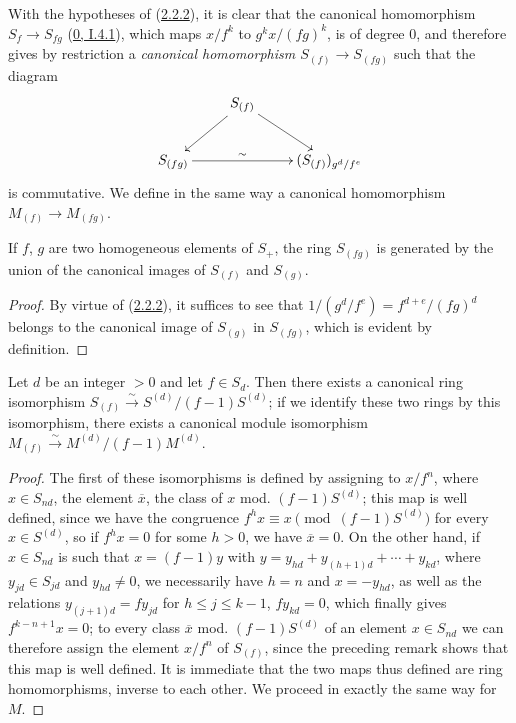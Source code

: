 \begin{env}[2.2.3]
\label{II.2.2.3}
With the hypotheses of (\hyperref[II.2.2.2]{2.2.2}), it is clear that
the canonical homomorphism $S_f\to S_{fg}$
(\hyperref[0.1.4.1]{0, I.4.1}), which maps $x/f^k$ to
$g^k x/(fg)^k$, is of degree $0$, and therefore gives by restriction a
\emph{canonical homomorphism $S_{(f)}\to S_{(fg)}$} such that the diagram
\[
  \xymatrix{
    & S_{(f)}\ar[dl]\ar[dr]\\
    S_{(fg)}\ar[rr]^-{\sim} && (S_{(f)})_{g^d/f^e}
  }
\]
is commutative. We define in the same way a canonical homomorphism
$M_{(f)}\to M_{(fg)}$.
\end{env}

\begin{lemma}[2.2.4]
\label{II.2.2.4}
If $f$, $g$ are two homogeneous elements of $S_+$, the ring $S_{(fg)}$ is
generated by the union of the canonical images of $S_{(f)}$ and $S_{(g)}$.
\end{lemma}

\begin{proof}
By virtue of (\hyperref[II.2.2.2]{2.2.2}), it suffices to see that
$1/(g^d/f^e)=f^{d+e}/(fg)^d$ belongs to the canonical image of $S_{(g)}$
in $S_{(fg)}$, which is evident by definition.
\end{proof}

\begin{proposition}[2.2.5]
\label{II.2.2.5}
Let $d$ be an integer $>0$ and let $f\in S_d$. Then there exists a canonical
ring isomorphism
$S_{(f)}\xrightarrow{\sim}S^{(d)}/(f-1)S^{(d)}$; if we identify these two
rings by this isomorphism, there exists a canonical module isomorphism
$M_{(f)}\xrightarrow{\sim}M^{(d)}/(f-1)M^{(d)}$.
\end{proposition}

\begin{proof}
The first of these isomorphisms is defined by assigning to
$x/f^n$, where $x\in S_{nd}$, the element $\overline{x}$, the class of $x$
mod. $(f-1)S^{(d)}$; this map is well defined, since we have the congruence
$f^h x\equiv x\pmod{(f-1)S^{(d)}}$ for every $x\in S^{(d)}$, so if
$f^h x=0$ for some $h>0$,
we have $\overline{x}=0$. On the other hand, if $x\in S_{nd}$ is such that
$x=(f-1)y$ with
$y=y_{hd}+y_{(h+1)d}+\cdots+y_{kd}$, where $y_{jd}\in S_{jd}$ and
$y_{hd}\neq 0$, we necessarily have $h=n$ and $x=-y_{hd}$, as well as the
relations $y_{(j+1)d}=fy_{jd}$ for $h\leq j\leq k-1$, $fy_{kd}=0$, which
finally gives $f^{k-n+1}x=0$; to every class $\overline{x}$ mod.
$(f-1)S^{(d)}$ of an element $x\in S_{nd}$ we can therefore assign
the element $x/f^n$ of $S_{(f)}$, since the preceding remark shows that this
map is well defined. It is immediate that the two maps thus
defined are ring homomorphisms, inverse to each other. We
proceed in exactly the same way for $M$.
\end{proof}

